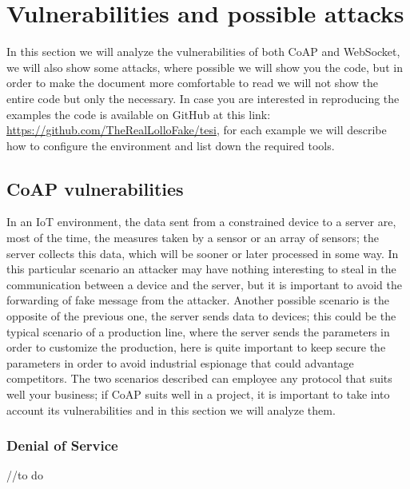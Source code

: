 	\section{Vulnerabilities and possible attacks}
	In this section we will analyze the vulnerabilities of both CoAP and WebSocket, we will also show some attacks,
	where possible we will show you the code, but in order to make the document more comfortable to read we will not
	show the entire code but only the necessary.\newline
	In case you are interested in reproducing the examples the code is available on GitHub at this link: \url{https://github.com/TheRealLolloFake/tesi}, for each example we will describe how to configure the environment
	and list down the required tools.\newline
	
	\subsection{CoAP vulnerabilities}
	In an IoT environment, the data sent from a constrained device to a server are, most of the time, the measures taken by a sensor or an array of sensors; the server collects this data, which will be sooner or later processed in some way.\newline
	In this particular scenario an attacker may have nothing interesting to steal in the communication between a device and the server, but it is important to avoid the forwarding of fake message from the attacker.\newline
	Another possible scenario is the opposite of the previous one, the server sends data to devices; this could be the typical scenario of a production line, where the server sends the parameters in order to customize the production, here is quite important to keep secure the parameters in order to avoid industrial espionage that could advantage competitors.\newline
	The two scenarios described can employee any protocol that suits well your business; if CoAP suits well in a project, it is important to take into account its vulnerabilities and in this section we will analyze them.\newline
	
	\subsubsection{Denial of Service}
	//to do
	
